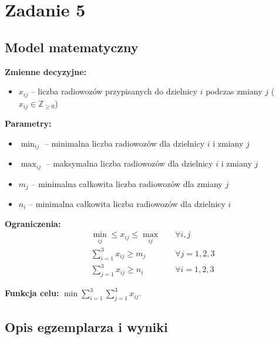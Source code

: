 \documentclass[a4paper,12pt]{article}
\begin{document}
\section*{Zadanie 5}
\subsection*{Model matematyczny}

\textbf{Zmienne decyzyjne:}
\begin{itemize}
\item $x_{ij}$ -- liczba radiowozów przypisanych do dzielnicy $i$ podczas zmiany $j$ ($x_{ij} \in \mathbb{Z}_{\geq 0}$)
\end{itemize}

\textbf{Parametry:}
\begin{itemize}
\item $\min_{ij}$ -- minimalna liczba radiowozów dla dzielnicy $i$ i zmiany $j$
\item $\max_{ij}$ -- maksymalna liczba radiowozów dla dzielnicy $i$ i zmiany $j$
\item $m_j$ -- minimalna całkowita liczba radiowozów dla zmiany $j$
\item $n_i$ -- minimalna całkowita liczba radiowozów dla dzielnicy $i$
\end{itemize}

\textbf{Ograniczenia:}
\begin{align*}
\min_{ij} \leq x_{ij} \leq \max_{ij} \quad &\forall i,j \\
\sum_{i=1}^{3} x_{ij} \geq m_j \quad &\forall j=1,2,3 \\
\sum_{j=1}^{3} x_{ij} \geq n_i \quad &\forall i=1,2,3
\end{align*}

\textbf{Funkcja celu:} $\min \sum_{i=1}^{3} \sum_{j=1}^{3} x_{ij}$.

\subsection*{Opis egzemplarza i wyniki}
\end{document}
